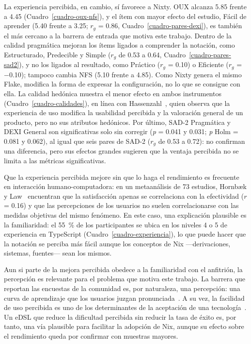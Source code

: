 La experiencia percibida, en cambio, sí favorece a Nixty. OUX alcanza 5.85 frente a 4.45 (Cuadro~\ref{cuadro-oux-nfs}), y el ítem con mayor efecto del estudio, Fácil de aprender (5.40 frente a 3.25; $r_g$ = 0.86, Cuadro~\ref{cuadro-pares-dexi}), es también el más cercano a la barrera de entrada que motiva este trabajo. Dentro de la calidad pragmática mejoran los ítems ligados a comprender la notación, como Estructurado, Predecible y Simple ($r_g$ de 0.53 a 0.64, Cuadro~\ref{cuadro-pares-sad2}), y no los ligados al resultado, como Práctico ($r_g$ = 0.10) o Eficiente ($r_g$ = $-$0.10); tampoco cambia NFS (5.10 frente a 4.85). Como Nixty genera el mismo Flake, modifica la forma de expresar la configuración, no lo que se consigue con ella. La calidad hedónica muestra el menor efecto en ambos instrumentos (Cuadro~\ref{cuadro-calidades}), en línea con Hassenzahl~\cite{hassenzahlPDFInterplayBeauty2026}, quien observa que la experiencia de uso modifica la usabilidad percibida y la valoración general de un producto, pero no sus atributos hedónicos. Por último, SAD-2 Pragmática y DEXI General son significativas solo sin corregir (\emph{p} = 0.041 y 0.031; \emph{p} Holm = 0.081 y 0.062), al igual que seis pares de SAD-2 ($r_g$ de 0.53 a 0.72): no confirman una diferencia, pero sus efectos grandes sugieren que la ventaja percibida no se limita a las métricas significativas.

Que la experiencia percibida mejore sin que lo haga el rendimiento es frecuente en interacción humano-computadora: en un metaanálisis de 73 estudios, Hornbæk y Law~\cite{hornbaekMetaanalysisCorrelationsUsability2007} encuentran que la satisfacción apenas se correlaciona con la efectividad ($r$ = 0.16) y que las percepciones de los usuarios no suelen correlacionarse con las medidas objetivas del mismo fenómeno. En este caso, una explicación plausible es la familiaridad: el 55~\% de los participantes se ubica en los niveles 4 o 5 de experiencia en TypeScript (Cuadro~\ref{cuadro-experiencia}), lo que puede hacer que la notación se perciba más fácil aunque los conceptos de Nix ---derivaciones, sistemas, fuentes--- sean los mismos.

Aun si parte de la mejora percibida obedece a la familiaridad con el anfitrión, la percepción es relevante para el problema que motiva este trabajo. La barrera que reportan las encuestas de la comunidad es, por naturaleza, una percepción: una curva de aprendizaje que los usuarios juzgan pronunciada~\cite{NixCommunitySurvey2024}. A su vez, la facilidad de uso percibida es uno de los determinantes de la aceptación de una tecnología~\cite{davisPerceivedUsefulnessPerceived1989a}. Un eDSL que reduce la dificultad percibida sin reducir la tasa de éxito es, por tanto, una vía plausible para facilitar la adopción de Nix, aunque su efecto sobre el rendimiento queda por confirmar con muestras mayores.
